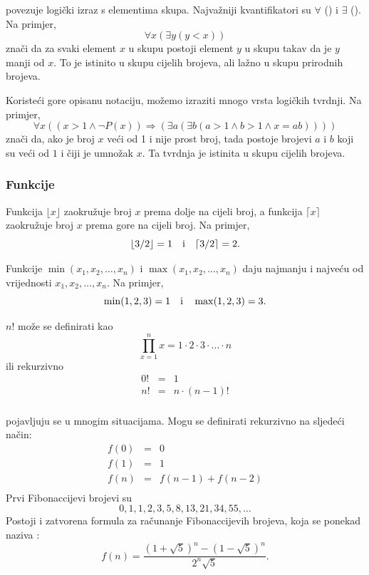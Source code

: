 
 povezuje logički izraz
s elementima skupa.
Najvažniji kvantifikatori su
$\forall$ () i $\exists$ ().
Na primjer,
\[\forall x (\exists y (y < x))\]
znači da za svaki element $x$ u skupu
postoji element $y$ u skupu
takav da je $y$ manji od $x$.
To je istinito u skupu cijelih brojeva,
ali lažno u skupu prirodnih brojeva.

Koristeći gore opisanu notaciju,
možemo izraziti mnogo vrsta logičkih tvrdnji.
Na primjer,
\[\forall x ((x>1 \land \lnot P(x)) \Rightarrow (\exists a (\exists b (a > 1 \land b > 1 \land x = ab))))\]
znači da, ako je broj $x$ veći od 1
i nije prost broj,
tada postoje brojevi $a$ i $b$
koji su veći od $1$ i čiji je umnožak $x$.
Ta tvrdnja je istinita u skupu cijelih brojeva.

\subsubsection{Funkcije}

Funkcija $\lfloor x \rfloor$ zaokružuje broj $x$
prema dolje na cijeli broj, a funkcija
$\lceil x \rceil$ zaokružuje broj $x$
prema gore na cijeli broj. Na primjer,
\[ \lfloor 3/2 \rfloor = 1 \hspace{10px} \textrm{i} \hspace{10px} \lceil 3/2 \rceil = 2.\]

Funkcije $\min(x_1,x_2,\ldots,x_n)$
i $\max(x_1,x_2,\ldots,x_n)$
daju najmanju i najveću od vrijednosti
$x_1,x_2,\ldots,x_n$.
Na primjer,
\[ \min(1,2,3)=1 \hspace{10px} \textrm{i} \hspace{10px} \max(1,2,3)=3.\]


 $n!$ može se definirati kao
\[\prod_{x=1}^n x = 1 \cdot 2 \cdot 3 \cdot \ldots \cdot n\]
ili rekurzivno
\[
\begin{array}{lcl}
0! & = & 1 \\
n! & = & n \cdot (n-1)! \\
\end{array}
\]


pojavljuju se u mnogim situacijama.
Mogu se definirati rekurzivno na sljedeći način:
\[
\begin{array}{lcl}
f(0) & = & 0 \\
f(1) & = & 1 \\
f(n) & = & f(n-1)+f(n-2) \\
\end{array}
\]
Prvi Fibonaccijevi brojevi su
\[0, 1, 1, 2, 3, 5, 8, 13, 21, 34, 55, \ldots\]
Postoji i zatvorena formula
za računanje Fibonaccijevih brojeva, koja se ponekad naziva
 :
\[f(n)=\frac{(1 + \sqrt{5})^n - (1-\sqrt{5})^n}{2^n \sqrt{5}}.\]

